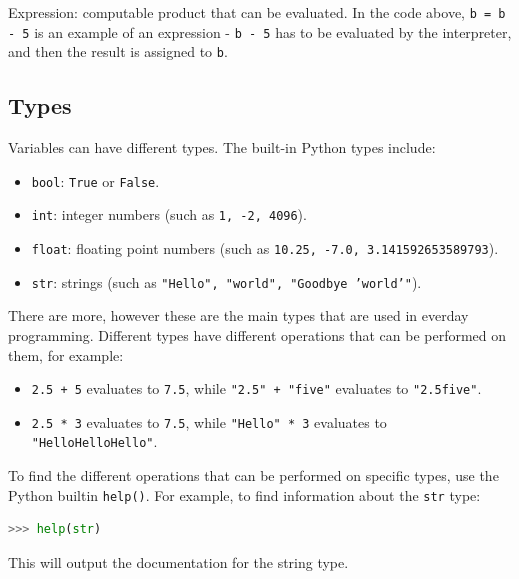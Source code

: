 \documentclass[a4paper]{report}
\begin{document}
Expression: computable product that can be evaluated. In the code above,
\texttt{b = b - 5} is an example of an expression - \texttt{b - 5} has to be
evaluated by the interpreter, and then the result is assigned to \texttt{b}.

\subsection{Types}

Variables can have different types. The built-in Python types include:

\begin{itemize}
	\item{\texttt{bool}: \texttt{True} or \texttt{False}.}
	\item{\texttt{int}: integer numbers (such as \texttt{1, -2, 4096}).}
	\item{\texttt{float}: floating point numbers (such as \texttt{10.25,
		-7.0, 3.141592653589793}).}
	\item{\texttt{str}: strings (such as \texttt{"Hello", "world",
		"Goodbye 'world'"}).}
\end{itemize}

There are more, however these are the main types that are used in everday
programming. Different types have different operations that can be performed
on them, for example:

\begin{itemize}
	\item{\texttt{2.5 + 5} evaluates to \texttt{7.5}, while \texttt{"2.5"
		+ "five"} evaluates to \texttt{"2.5five"}.}
	\item{\texttt{2.5 * 3} evaluates to \texttt{7.5}, while
		\texttt{"Hello" * 3} evaluates to \texttt{"HelloHelloHello"}.}
\end{itemize}

To find the different operations that can be performed on specific types, use
the Python builtin \texttt{help()}. For example, to find information about the
\texttt{str} type:

\begin{lstlisting}[language=Python]
>>> help(str)
\end{lstlisting}

This will output the documentation for the string type.
\end{document}
